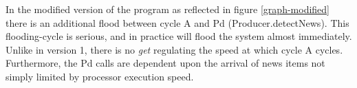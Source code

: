 \documentclass[12pt]{article}%
\begin{document}
In the modified version of the program as reflected in figure \ref{graph-modified} there is an additional flood between cycle A and
Pd (Producer.detectNews). This flooding-cycle is serious, and in practice will flood the system almost immediately.
Unlike in version 1, there is no \emph{get} regulating the speed at which cycle A cycles. Furthermore, the Pd calls are dependent upon the
arrival of news items not simply limited by processor execution speed.



% 

%
\end{document}
